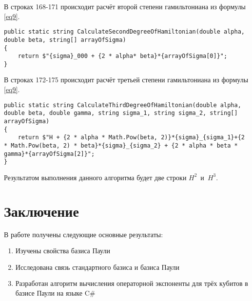 \documentclass[a4paper]{report}
\begin{document}
В строках 168-171 происходит расчёт второй степени гамильтониана из формулы \eqref{eq9}.
\begin{lstlisting}[firstnumber=168]
public static string СalculateSecondDegreeOfHamiltonian(double alpha, double beta, string[] arrayOfSigma)
{
	return $"{sigma}_000 + {2 * alpha* beta}*{arrayOfSigma[0]}";
}
\end{lstlisting}

В строках 172-175 происходит расчёт третьей степени гамильтониана из формулы \eqref{eq9}.
\begin{lstlisting}[firstnumber=172]
public static string СalculateThirdDegreeOfHamiltonian(double alpha, double beta, double gamma, string sigma_1, string sigma_2, string[] arrayOfSigma)
{
	return $"H + {2 * alpha * Math.Pow(beta, 2)}*{sigma}_{sigma_1}+{2 * Math.Pow(beta, 2) * beta}*{sigma}_{sigma_2} + {2 * alpha * beta * gamma}*{arrayOfSigma[2]}";
}
\end{lstlisting}

\noindent Результатом выполнения данного алгоритма будет две строки \mbox{$H^2$ и $H^3$}.

\newpage


\section*{Заключение}
В работе получены следующие основные результаты:
\begin{enumerate}
    \item{Изучены свойства базиса Паули}
    \item{Исследована связь стандартного базиса и базиса Паули}
    \item{Разработан алгоритм вычисления операторной экспоненты для трёх кубитов в базисе Паули на языке C$\#$}
\end{enumerate}

\newpage

\end{document}
